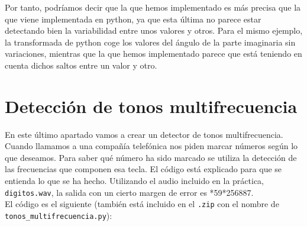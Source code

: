 \documentclass[11pt,a4paper]{article}
\begin{document}
Por tanto, podríamos decir que la que hemos implementado es más precisa que la que viene implementada en python, ya que esta última no parece estar detectando bien la variabilidad entre unos valores y otros. Para el mismo ejemplo, la transformada de python coge los valores del ángulo de la parte imaginaria sin variaciones, mientras que la que hemos implementado parece que está teniendo en cuenta dichos saltos entre un valor y otro.

\newpage

\section{Detección de tonos multifrecuencia}

En este último apartado vamos a crear un detector de tonos multifrecuencia.\\

Cuando llamamos a una compañía telefónica nos piden marcar números según lo que deseamos. Para saber qué número ha sido marcado se utiliza la detección de las frecuencias que componen esa tecla.
El código está explicado para que se entienda lo que se ha hecho. Utilizando el audio incluido en la práctica, \texttt{digitos.wav}, la salida con un cierto margen de error es *59*256887.\\

El código es el siguiente (también está incluido en el \texttt{.zip} con el nombre de\\ \texttt{tonos\_multifrecuencia.py}):
\end{document}
